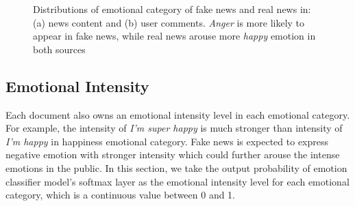 \documentclass{article}
\newcommand{\kai}[1]{\textcolor{blue}{Kai: {#1}}}
\begin{document}
	\begin{figure}[h]
		\centering
		
		\begin{minipage}[t]{0.23\textwidth}
		\end{minipage}
		\begin{minipage}[t]{0.23\textwidth}
		\end{minipage}
		
		\caption{Distributions of emotional category of fake news and real news in: (a) news content and (b) user comments. {\em Anger} is more likely to appear in fake news, while real news arouse more {\em happy} emotion in both sources}
		\vspace{-0.3cm}
		\label{Fig:emotionCategories}
	\end{figure}
	
	\subsection{Emotional Intensity}
	
	Each document also owns an emotional intensity level in each emotional category. For example, the intensity of {\em I'm super happy} is much stronger than intensity of {\em I'm happy} in happiness emotional category. Fake news is expected to express negative emotion with stronger intensity which could further arouse the intense emotions in the public. In this section, we take the output probability of emotion classifier model’s softmax layer as the emotional intensity level for each emotional category, which is a continuous value between 0 and 1.
	
\end{document}

